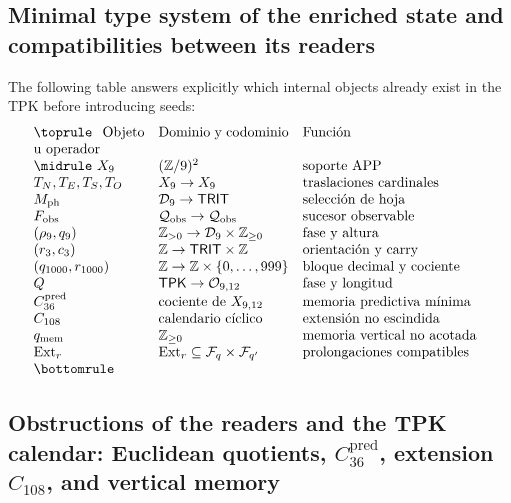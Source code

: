 \subsection{Minimal type system of the enriched state and compatibilities between its readers}

The following table answers explicitly which internal objects
already exist in the TPK before introducing seeds:
\[
\begin{array}{p{.23\textwidth}p{.27\textwidth}p{.38\textwidth}}
\toprule
Objeto u operador&Dominio y codominio&Función\\\midrule
\(X_9\)&\((\mathbb Z/9)^2\)&soporte APP\\
\(T_N,T_E,T_S,T_O\)&\(X_9\to X_9\)&traslaciones cardinales\\
\(M_{\rm ph}\)&\(\mathcal D_9\to\mathsf{TRIT}\)&selección de hoja\\
\(F_{\rm obs}\)&\(\mathcal Q_{\rm obs}\to\mathcal Q_{\rm obs}\)&sucesor observable\\
\((\rho_9,q_9)\)&\(\mathbb Z_{>0}\to\mathcal D_9\times\mathbb Z_{\ge0}\)&fase y altura\\
\((r_3,c_3)\)&\(\mathbb Z\to\mathsf{TRIT}\times\mathbb Z\)&orientación y carry\\
\((q_{1000},r_{1000})\)&\(\mathbb Z\to\mathbb Z\times\{0,\ldots,999\}\)&bloque decimal y cociente\\
\(Q\)&\(\mathsf{TPK}\to\mathcal O_{9,12}\)&fase y longitud\\
\(C_{36}^{\rm pred}\)&cociente de \(X_{9,12}\)&memoria predictiva mínima\\
\(C_{108}\)&calendario cíclico&extensión no escindida\\
\(q_{\rm mem}\)&\(\mathbb Z_{\ge0}\)&memoria vertical no acotada\\
\(\operatorname{Ext}_r\)&
\(\operatorname{Ext}_r\subseteq\mathcal F_q\times\mathcal F_{q'}\)&
prolongaciones compatibles\\
\bottomrule
\end{array}
\]

\subsection{Obstructions of the readers and the TPK calendar: Euclidean quotients, \(C_{36}^{\mathrm{pred}}\), extension \(C_{108}\), and vertical memory}


